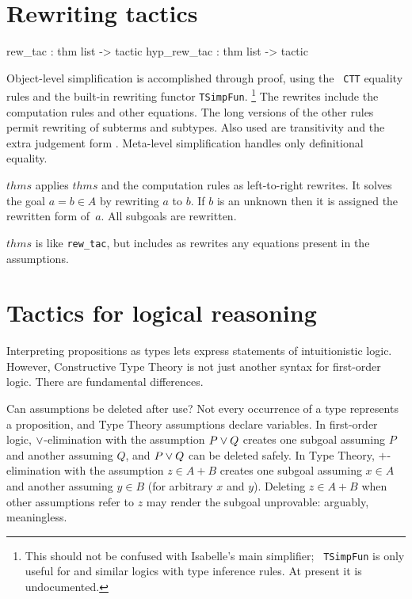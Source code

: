 \section{Rewriting tactics}
\begin{ttbox}
rew_tac     : thm list -> tactic
hyp_rew_tac : thm list -> tactic
\end{ttbox}
Object-level simplification is accomplished through proof, using the {\tt
  CTT} equality rules and the built-in rewriting functor
{\tt TSimpFun}.%
\footnote{This should not be confused with Isabelle's main simplifier; {\tt
    TSimpFun} is only useful for {\CTT} and similar logics with type
  inference rules.  At present it is undocumented.} 
%
The rewrites include the computation rules and other equations.  The long
versions of the other rules permit rewriting of subterms and subtypes.
Also used are transitivity and the extra judgement form .
Meta-level simplification handles only definitional equality.
\begin{ttdescription}
\item[\ttindexbold{rew_tac} $thms$]
applies $thms$ and the computation rules as left-to-right rewrites.  It
solves the goal $a=b\in A$ by rewriting $a$ to $b$.  If $b$ is an unknown
then it is assigned the rewritten form of~$a$.  All subgoals are rewritten.

\item[\ttindexbold{hyp_rew_tac} $thms$]
is like {\tt rew_tac}, but includes as rewrites any equations present in
the assumptions.
\end{ttdescription}


\section{Tactics for logical reasoning}
Interpreting propositions as types lets {\CTT} express statements of
intuitionistic logic.  However, Constructive Type Theory is not just
another syntax for first-order logic.  There are fundamental differences.

Can assumptions be deleted after use?  Not every occurrence of a type
represents a proposition, and Type Theory assumptions declare variables.
In first-order logic, $\vee$-elimination with the assumption $P\vee Q$
creates one subgoal assuming $P$ and another assuming $Q$, and $P\vee Q$
can be deleted safely.  In Type Theory, $+$-elimination with the assumption
$z\in A+B$ creates one subgoal assuming $x\in A$ and another assuming $y\in
B$ (for arbitrary $x$ and $y$).  Deleting $z\in A+B$ when other assumptions
refer to $z$ may render the subgoal unprovable: arguably,
meaningless.

